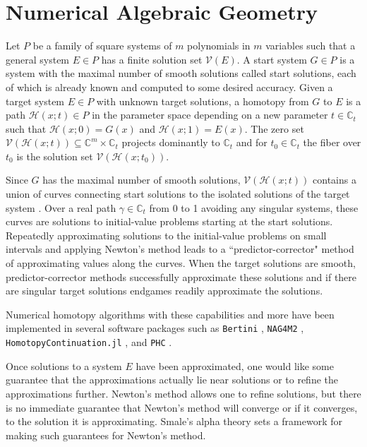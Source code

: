 \documentclass[12pt]{amsart}
\theoremstyle{definition}
\newcommand{\defcolor}[1]{{\color{RoyalBlue}#1}}
\begin{document}
\section{Numerical Algebraic Geometry}
%
Let $P$ be a family of square systems of $m$ polynomials in $m$ variables such that a general system $E\in P$ has a finite \defcolor{solution set} $\mathcal{V}(E)$. A \defcolor{start system} $G\in P$ is a system with the maximal number of smooth solutions called \defcolor{start solutions}, each of which is already known and computed to some desired accuracy. Given a \defcolor{target system} $E\in P$ with unknown \defcolor{target solutions}, a \defcolor{homotopy} from $G$ to $E$ is a path $\mathcal{H}(x;t)\in P$ in the parameter space depending on a new parameter $t\in\mathbb{C}_t$ such that $\mathcal{H}(x;0) = G(x)$ and $\mathcal{H}(x;1)=E(x)$. The zero set $\mathcal{V}(\mathcal{H}(x;t))\subseteq\mathbb{C}^m\times\mathbb{C}_t$ projects dominantly to $\mathbb{C}_t$ and for $t_0\in\mathbb{C}_t$ the fiber over $t_0$ is the solution set $\mathcal{V}(\mathcal{H}(x;t_0))$. 

Since $G$ has the maximal number of smooth solutions, $\mathcal{V}(\mathcal{H}(x;t))$ contains a union of curves connecting start solutions to the isolated solutions of the target system \cite{Morgan}. Over a real path $\gamma\in\mathbb{C}_t$ from 0 to 1 avoiding any singular systems, these curves are solutions to initial-value problems starting at the start solutions. Repeatedly approximating solutions to the initial-value problems on small intervals and applying Newton's method leads to a ``predictor-corrector" method of approximating values along the curves. When the target solutions are smooth, predictor-corrector methods successfully approximate these solutions and if there are singular target solutions endgames readily approximate the solutions.

Numerical homotopy algorithms with these capabilities and more have been implemented in several software packages such as \texttt{Bertini} \cite{Bertini}, \texttt{NAG4M2} \cite{NAG4M2}, \texttt{HomotopyContinuation.jl} \cite{HCJL}, and \texttt{PHC} \cite{PHCpack}.



%
Once solutions to a system $E$ have been approximated, one would like some guarantee that the approximations actually lie near solutions or to refine the approximations further. Newton's method allows one to refine solutions, but there is no immediate guarantee that Newton's method will converge or if it converges, to the solution it is approximating. Smale's alpha theory sets a framework for making such guarantees for Newton's method. 
\end{document}
